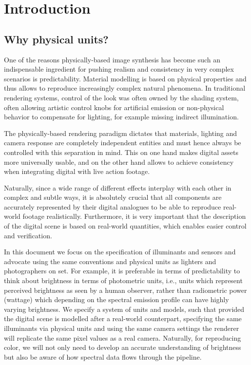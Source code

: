 
\chapter{Introduction}

\section{Why physical units?}


One of the reasons physically-based image synthesis has become such an
indispensable ingredient for pushing realism and consistency in very
complex scenarios is predictability. Material modelling is based on
physical properties and thus allows to reproduce increasingly complex
natural phenomena. In traditional rendering systems, control of the
look was often owned by the shading system, often allowing artistic
control knobs for artificial emission or non-physical behavior to
compensate for lighting, for example missing indirect illumination.

The physically-based rendering paradigm dictates that materials,
lighting and camera response are completely independent entities and
must hence always be controlled with this separation in mind. This
on one hand makes digital assets more universally usable, and on the
other hand allows to achieve consistency when integrating digital with
live action footage.

Naturally, since a wide range of different effects interplay with each
other in complex and subtle ways, it is absolutely crucial that all
components are accurately represented by their digital analogues to be
able to reproduce real-world footage realistically. Furthermore, it is
very important that the description of the digital scene is based on
real-world quantities, which enables easier control and verification.

In this document we focus on the specification of illuminants and
sensors and advocate using the same conventions and physical units as
lighters and photographers on set. For example, it is preferable in
terms of predictability to think about brightness in terms of
photometric units, i.e., units which represent perceived brightness as
seen by a human observer, rather than radiometric power (wattage)
which depending on the spectral emission profile can have highly
varying brightness. We specify a system of units and models, such that
provided the digital scene is modelled after a real-world counterpart,
specifying the same illuminants via physical units and using the same
camera settings the renderer will replicate the same pixel values as a
real camera. Naturally, for reproducing color, we will not only need
to develop an accurate understanding of brightness but also be aware
of how spectral data flows through the pipeline.


